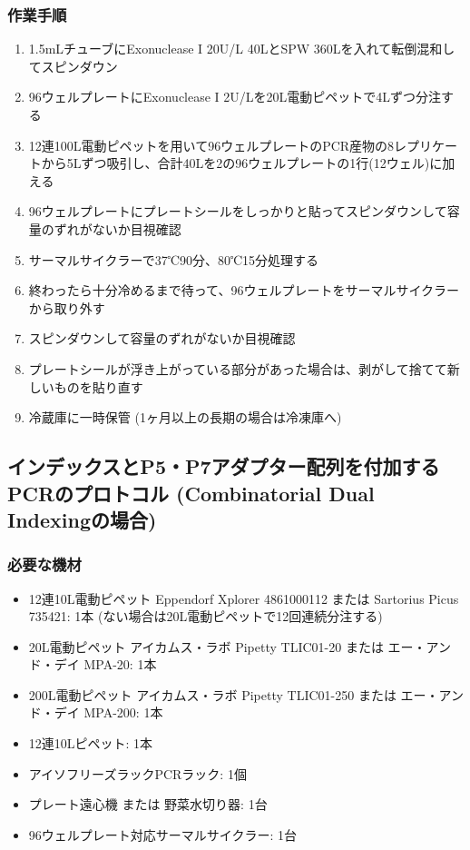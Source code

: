 \documentclass[titlepage,10pt,a4paper,uplatex]{jsbook}
\begin{document}
\subsubsection{作業手順}
\begin{enumerate}
\item 1.5mLチューブにExonuclease I 20U/{\textmu}L 40{\textmu}LとSPW 360{\textmu}Lを入れて転倒混和してスピンダウン
\item 96ウェルプレートにExonuclease I 2U/{\textmu}Lを20{\textmu}L電動ピペットで4{\textmu}Lずつ分注する
\item 12連100{\textmu}L電動ピペットを用いて96ウェルプレートのPCR産物の8レプリケートから5{\textmu}Lずつ吸引し、合計40{\textmu}Lを2の96ウェルプレートの1行(12ウェル)に加える
\item 96ウェルプレートにプレートシールをしっかりと貼ってスピンダウンして容量のずれがないか目視確認
\item サーマルサイクラーで37℃90分、80℃15分処理する
\item 終わったら十分冷めるまで待って、96ウェルプレートをサーマルサイクラーから取り外す
\item スピンダウンして容量のずれがないか目視確認
\item プレートシールが浮き上がっている部分があった場合は、剥がして捨てて新しいものを貼り直す
\item 冷蔵庫に一時保管 (1ヶ月以上の長期の場合は冷凍庫へ)
\end{enumerate}

\subsection{インデックスとP5・P7アダプター配列を付加するPCRのプロトコル (Combinatorial Dual Indexingの場合)}

\subsubsection{必要な機材}
\begin{itemize}
\item 12連10{\textmu}L電動ピペット Eppendorf Xplorer 4861000112 または Sartorius Picus 735421: 1本 (ない場合は20{\textmu}L電動ピペットで12回連続分注する)
\item 20{\textmu}L電動ピペット アイカムス・ラボ Pipetty TLIC01-20 または エー・アンド・デイ MPA-20: 1本
\item 200{\textmu}L電動ピペット アイカムス・ラボ Pipetty TLIC01-250 または エー・アンド・デイ MPA-200: 1本
\item 12連10{\textmu}Lピペット: 1本
\item アイソフリーズラックPCRラック: 1個
\item プレート遠心機 または 野菜水切り器: 1台
\item 96ウェルプレート対応サーマルサイクラー: 1台
\end{itemize}
\end{document}
